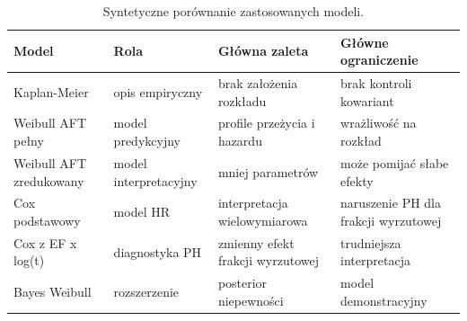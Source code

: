 \begin{table}[htbp]
\centering
\caption{Syntetyczne porównanie zastosowanych modeli.}
\label{tab:synthesis}
\scriptsize
\setlength{\tabcolsep}{2.4pt}
\begin{tabular}{p{}p{}p{}p{}}
\toprule
Model & Rola & Główna zaleta & Główne ograniczenie \\
\midrule
Kaplan-Meier & opis empiryczny & brak założenia rozkładu & brak kontroli kowariant \\
Weibull AFT pełny & model predykcyjny & profile przeżycia i hazardu & wrażliwość na rozkład \\
Weibull AFT zredukowany & model interpretacyjny & mniej parametrów & może pomijać słabe efekty \\
Cox podstawowy & model HR & interpretacja wielowymiarowa & naruszenie PH dla frakcji wyrzutowej \\
Cox z EF x log(t) & diagnostyka PH & zmienny efekt frakcji wyrzutowej & trudniejsza interpretacja \\
Bayes Weibull & rozszerzenie & posterior niepewności & model demonstracyjny \\
\bottomrule
\end{tabular}
\end{table}
